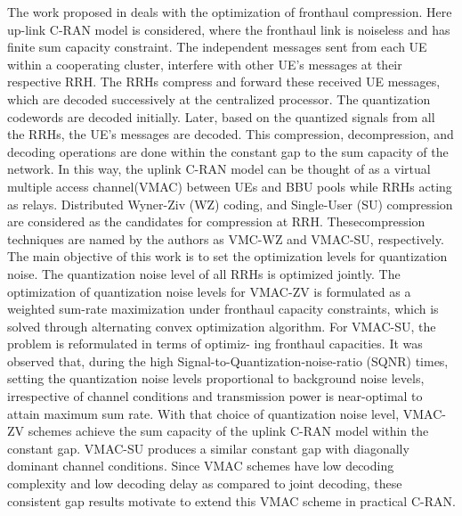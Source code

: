 \begin{multicols}{2}
\begin{itemize}
The work proposed in \cite{art3-key53} deals with the optimization of fronthaul compression. Here up-link C-RAN model is considered, where the fronthaul link is noiseless and has finite sum capacity constraint. The independent messages sent from each UE within a cooperating cluster, interfere with other UE’s messages at their respective RRH. The RRHs compress and forward these received UE messages, which are decoded successively at the centralized processor. The quantization codewords are decoded initially. Later, based on the quantized signals from all the RRHs, the UE’s messages are decoded. This compression, decompression, and decoding operations are done within the constant gap to the sum capacity of the network. In this way, the uplink C-RAN model can be thought of as a virtual multiple access channel(VMAC) between UEs and BBU pools while RRHs acting as relays. Distributed Wyner-Ziv (WZ) coding, and Single-User (SU) compression are considered as the candidates for compression at RRH. These\break compression techniques are named by the authors as VMC-WZ and VMAC-SU, respectively. The main objective of this work is to set the optimization levels for quantization noise. The quantization noise level of all RRHs is optimized jointly. The optimization of quantization noise levels for VMAC-ZV is formulated as a weighted sum-rate maximization under fronthaul capacity constraints, which is solved through alternating convex optimization algorithm. For VMAC-SU, the problem is reformulated in terms of optimiz- ing fronthaul capacities. It was observed that, during the high Signal-to-Quantization-noise-ratio (SQNR) times, setting the quantization noise levels proportional to background noise levels, irrespective of channel conditions and transmission power is near-optimal to attain maximum sum rate. With that choice of quantization noise level, VMAC-ZV schemes achieve the sum capacity of the uplink C-RAN model within the constant gap. VMAC-SU produces a similar constant gap with diagonally dominant channel conditions. Since VMAC schemes have low decoding complexity and low decoding delay as compared to joint decoding, these consistent gap results motivate to extend this VMAC scheme in practical \break C-RAN.


\end{itemize}
\end{multicols}
